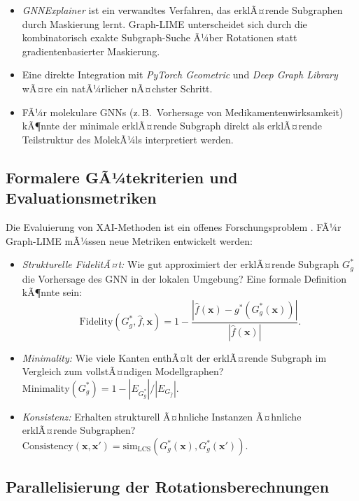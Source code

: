 ﻿\documentclass[a4paper,12pt]{article}
\theoremstyle{definition}
\begin{document}
\begin{itemize}
  \item \emph{GNNExplainer} \citep{Ying2019} ist ein verwandtes Verfahren, das
        erklÃ¤rende Subgraphen durch Maskierung lernt.
        Graph-LIME unterscheidet sich durch die kombinatorisch exakte
        Subgraph-Suche Ã¼ber Rotationen statt gradientenbasierter Maskierung.
  \item Eine direkte Integration mit \emph{PyTorch Geometric} \citep{Fey2019}
        und \emph{Deep Graph Library} \citep{Wang2019} wÃ¤re ein natÃ¼rlicher
        nÃ¤chster Schritt.
  \item FÃ¼r molekulare GNNs (z.\,B.\ Vorhersage von Medikamentenwirksamkeit)
        kÃ¶nnte der minimale erklÃ¤rende Subgraph direkt als erklÃ¤rende
        Teilstruktur des MolekÃ¼ls interpretiert werden.
\end{itemize}

\subsection{Formalere GÃ¼tekriterien und Evaluationsmetriken}

Die Evaluierung von XAI-Methoden ist ein offenes Forschungsproblem \citep{Doshi2017}.
FÃ¼r Graph-LIME mÃ¼ssen neue Metriken entwickelt werden:

\begin{itemize}
  \item \emph{Strukturelle FidelitÃ¤t:} Wie gut approximiert der erklÃ¤rende Subgraph
        $G^*_g$ die Vorhersage des GNN in der lokalen Umgebung?
        Eine formale Definition kÃ¶nnte sein:
        \[
          \mathrm{Fidelity}(G^*_g, \hat{f}, \mathbf{x})
          = 1 - \frac{|\hat{f}(\mathbf{x}) - g^*(G^*_g(\mathbf{x}))|}
                     {|\hat{f}(\mathbf{x})|}.
        \]
  \item \emph{Minimality:} Wie viele Kanten enthÃ¤lt der erklÃ¤rende Subgraph
        im Vergleich zum vollstÃ¤ndigen Modellgraphen?
        $\mathrm{Minimality}(G^*_g) = 1 - |E_{G^*_g}| / |E_{G_{\hat{f}}}|$.
  \item \emph{Konsistenz:} Erhalten strukturell Ã¤hnliche Instanzen Ã¤hnliche
        erklÃ¤rende Subgraphen?
        $\mathrm{Consistency}(\mathbf{x}, \mathbf{x}')
         = \mathrm{sim}_{\mathrm{LCS}}(G^*_g(\mathbf{x}), G^*_g(\mathbf{x}'))$.
\end{itemize}

\subsection{Parallelisierung der Rotationsberechnungen}
\end{document}
